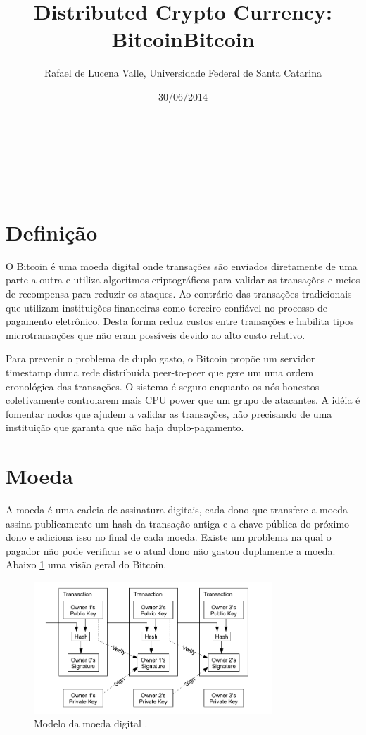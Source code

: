 \documentclass[a4paper,11pt]{article}
\makeatletter
\newcommand{\linia}{\rule{\linewidth}{0.5pt}}
\theoremstyle{mytheor}
\renewcommand{\maketitle}{
\begin{center}
\vspace{2ex}
{\huge \textsc{\@title}}
\vspace{1ex}
\\
\linia\\
\@author \hfill \@date
\vspace{4ex}
\end{center}
}
\makeatother
\begin{document}
\title{Distributed Crypto Currency: Bitcoin}

\author{Rafael de Lucena Valle, Universidade Federal de Santa Catarina}

\date{30/06/2014}

\maketitle

\title{Bitcoin}

\section*{Definição}

O Bitcoin é uma moeda digital onde transações são enviados diretamente de uma parte a outra e utiliza algoritmos criptográficos para validar as transações e meios de recompensa para reduzir os ataques. Ao contrário das transações tradicionais que utilizam instituições financeiras como terceiro confiável no processo de pagamento eletrônico. Desta forma reduz custos entre transações e habilita tipos microtransações que não eram possíveis devido ao alto custo relativo.

Para prevenir o problema de duplo gasto, o Bitcoin propõe um servidor timestamp duma rede distribuída peer-to-peer que gere um uma ordem cronológica das transações. O sistema é seguro enquanto os nós honestos coletivamente controlarem mais CPU power que um grupo de atacantes. A idéia é fomentar nodos que ajudem a validar as transações, não precisando de uma instituição que garanta que não haja duplo-pagamento.
\cite{nakamoto2008bitcoin}
\section*{Moeda}
A moeda é uma cadeia de assinatura digitais, cada dono que transfere a moeda assina publicamente um hash da transação antiga e a chave pública do próximo dono e adiciona isso no final de cada moeda. Existe um problema na qual o pagador não pode verificar se o atual dono não gastou duplamente a moeda. Abaixo \ref{bitcoin} uma visão geral do Bitcoin.


\begin{figure}[H]
   \label{bitcoin}
   \centering
   \includegraphics[width=0.8\textwidth]{images/coin.png}
   \caption{Modelo da moeda digital \cite{nakamoto2008bitcoin}.}
\end{figure}
\end{document}
